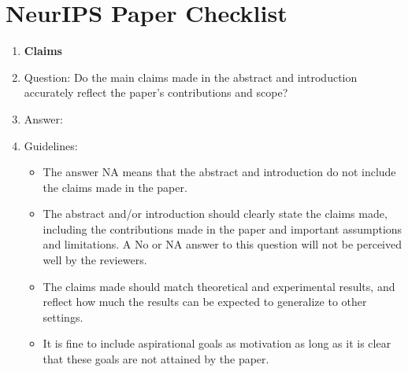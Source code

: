 \documentclass[11pt]{article}
\theoremstyle{plain}
\theoremstyle{definition}
\theoremstyle{remark}
\renewcommand{\^}[1]{^{(#1)}}
\begin{document}
\section*{NeurIPS Paper Checklist}
\begin{enumerate}

\item {\bf Claims}
    \item[] Question: Do the main claims made in the abstract and introduction accurately reflect the paper's contributions and scope?
    \item[] Answer: \answerYes{} 

   
    \item[] Guidelines:
    \begin{itemize}
        \item The answer NA means that the abstract and introduction do not include the claims made in the paper.
        \item The abstract and/or introduction should clearly state the claims made, including the contributions made in the paper and important assumptions and limitations. A No or NA answer to this question will not be perceived well by the reviewers. 
        \item The claims made should match theoretical and experimental results, and reflect how much the results can be expected to generalize to other settings. 
        \item It is fine to include aspirational goals as motivation as long as it is clear that these goals are not attained by the paper. 
    \end{itemize}


\end{enumerate}
\end{document}

